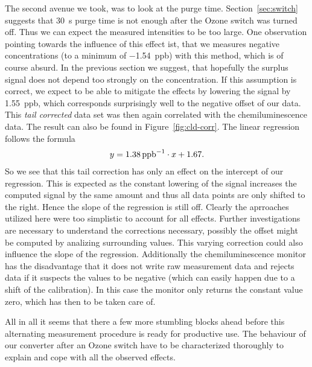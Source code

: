 The second avenue we took, was to look at the purge time.
Section~\ref{sec:switch} suggests that \SI{30}{\second} purge time is
not enough after the Ozone switch was turned off. Thus we can expect
the measured  intensities to be too large. One observation
pointing towards the influence of this effect ist, that we measures
negative  concentrations (to a minimum of \SI{-1.54}{ppb}) with
this method, which is of course absurd. In the previous section we
suggest, that hopefully the surplus  signal does not depend
too strongly on the  concentration. If this assumption is
correct, we expect to be able to mitigate the effects by lowering the
 signal by \SI{1.55}{ppb}, which corresponds surprisingly well
to the negative offset of our data. This \emph{tail corrected} data
set was then again correlated with the chemiluminescence data. The
result can also be found in Figure~\ref{fig:cld-corr}. The linear
regression follows the formula
\begin{align*}
  y = \SI{1.38}{ppb\tothe{-1}} \cdot x + 1.67.
\end{align*}
So we see that this tail correction has only an effect on the
intercept of our regression. This is expected as the constant lowering
of the  signal increases the computed  signal by the
same amount and thus all data points are only shifted to the
right. Hence the slope of the regression is still off. Clearly the
aprroaches utilized here were too simplistic to account for all
effects. Further investigations are necessary to understand the
corrections necessary, possibly the offset might be computed by
analizing surrounding  values. This varying 
correction could also influence the slope of the
regression. Additionally the chemiluminescence monitor has the
disadvantage that it does not write raw measurement data and rejects
data if it suspects the values to be negative (which can easily happen due
to a shift of the calibration). In this case the monitor only returns
the constant value zero, which has then to be taken care of. 

All in all it seems that there a few more stumbling blocks ahead
before this alternating measurement procedure is ready for productive
use. The behaviour of our converter after an Ozone switch have to be
characterized thoroughly to explain and cope with all the observed
effects.

